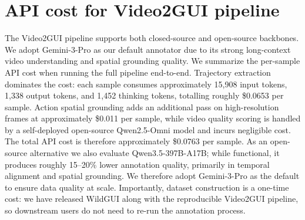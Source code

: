 \documentclass{article}
\theoremstyle{plain}
\theoremstyle{definition}
\theoremstyle{remark}
\newcommand{\ourdataset}{WildGUI}
\begin{document}
\section{API cost for Video2GUI pipeline}
\label{sec: pipeline cost}

The Video2GUI pipeline supports both closed-source and open-source backbones. We adopt Gemini-3-Pro as our default annotator due to its strong long-context video understanding and spatial grounding quality. We summarize the per-sample API cost when running the full pipeline end-to-end. Trajectory extraction dominates the cost: each sample consumes approximately 15{,}908 input tokens, 1{,}338 output tokens, and 1{,}452 thinking tokens, totalling roughly \$0.0653 per sample. Action spatial grounding adds an additional pass on high-resolution frames at approximately \$0.011 per sample, while video quality scoring is handled by a self-deployed open-source Qwen2.5-Omni model and incurs negligible cost. The total API cost is therefore approximately \$0.0763 per sample. As an open-source alternative we also evaluate Qwen3.5-397B-A17B; while functional, it produces roughly 15--20\% lower annotation quality, primarily in temporal alignment and spatial grounding. We therefore adopt Gemini-3-Pro as the default to ensure data quality at scale. Importantly, dataset construction is a one-time cost: we have released \ourdataset{} along with the reproducible Video2GUI pipeline, so downstream users do not need to re-run the annotation process.
\end{document}
